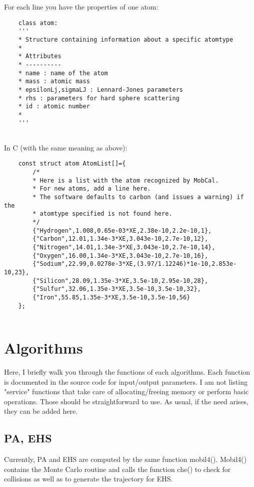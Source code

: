 \documentclass[letter,12pt]{article}
\begin{document}
For each line you have the properties of one atom:

\begin{verbatim}
    class atom:
    '''
    * Structure containing information about a specific atomtype
    * 
    * Attributes
    * ----------
    * name : name of the atom
    * mass : atomic mass
    * epsilonLj,sigmaLJ : Lennard-Jones parameters
    * rhs : parameters for hard sphere scattering
    * id : atomic number
    * 
    '''   
    
\end{verbatim}

In C (with the same meaning as above):
\begin{verbatim}
    const struct atom AtomList[]={
        /*
        * Here is a list with the atom recognized by MobCal.
        * For new atoms, add a line here.
        * The software defaults to carbon (and issues a warning) if the
        * atomtype specified is not found here.
        */
        {"Hydrogen",1.008,0.65e-03*XE,2.38e-10,2.2e-10,1},
        {"Carbon",12.01,1.34e-3*XE,3.043e-10,2.7e-10,12},
        {"Nitrogen",14.01,1.34e-3*XE,3.043e-10,2.7e-10,14},
        {"Oxygen",16.00,1.34e-3*XE,3.043e-10,2.7e-10,16},
        {"Sodium",22.99,0.0278e-3*XE,(3.97/1.12246)*1e-10,2.853e-10,23},
        {"Silicon",28.09,1.35e-3*XE,3.5e-10,2.95e-10,28},
        {"Sulfur",32.06,1.35e-3*XE,3.5e-10,3.5e-10,32},
        {"Iron",55.85,1.35e-3*XE,3.5e-10,3.5e-10,56}
    };    
    
\end{verbatim}

\section{Algorithms}
Here, I briefly walk you through the functions of each algorithms. 
Each function is documented in the source code for input/output parameters.
I am not listing "service" functions that take care of allocating/freeing memory or perform basic operations. 
Those should be straightforward to use. As usual, if the need arises, they can be added here.

\subsection{PA, EHS}
Currently, PA and EHS are computed by the same function mobil4(). 
Mobil4() contains the Monte Carlo routine and calls the function che() to check for collisions as well as to generate the
trajectory for EHS.
\end{document}
